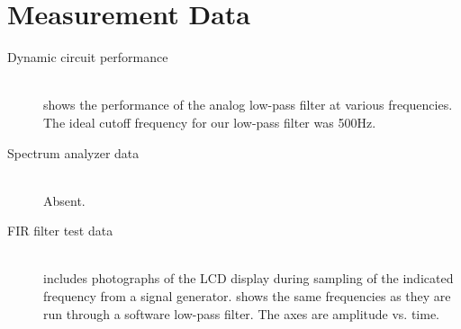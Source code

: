 \documentclass[12pt]{article}
\newcommand{\hbr}{\hfill\vspace{.25em}\\}
\begin{document}
\section{Measurement Data}
\begin{description}
\item[Dynamic circuit performance] \hbr
   shows the performance of the analog
  low-pass filter at various frequencies. The ideal cutoff frequency
  for our low-pass filter was 500Hz.
\item[Spectrum analyzer data] \hbr
  Absent.
\item[FIR filter test data] \hbr
   includes photographs of the LCD display
  during sampling of the indicated frequency from a signal
  generator.  shows the same frequencies
  as they are run through a software low-pass filter. The axes are
  amplitude vs. time.
\end{description}
\end{document}
